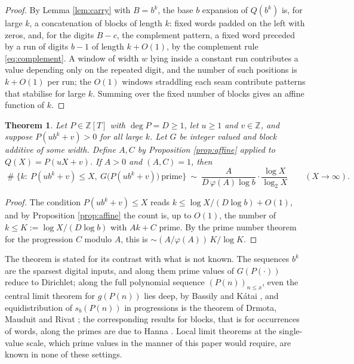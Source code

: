 \documentclass[11pt,reqno]{amsart}
\theoremstyle{plain}
\newtheorem{theorem}{Theorem}[section]
\theoremstyle{definition}
\newcommand{\Z}{\mathbb{Z}}
\DeclareMathOperator{\Card}{\#}
\begin{document}
\begin{proof}
By Lemma \ref{lem:carry} with $B=b^{k}$, the base $b$ expansion of $Q(b^k)$ is, for large $k$, a concatenation of blocks of length $k$: fixed words padded on the left with zeros, and, for the digits $B-c$, the complement pattern, a fixed word preceded by a run of digits $b-1$ of length $k+O(1)$, by the complement rule \eqref{eq:complement}. A window of width $w$ lying inside a constant run contributes a value depending only on the repeated digit, and the number of such positions is $k+O(1)$ per run; the $O(1)$ windows straddling each seam contribute patterns that stabilise for large $k$. Summing over the fixed number of blocks gives an affine function of $k$.
\end{proof}

\begin{theorem}\label{thm:blocking}
Let $P\in\Z[T]$ with $\deg P=D\ge1$, let $u\ge1$ and $v\in\Z$, and suppose $P(ub^{k}+v)>0$ for all large $k$. Let $G$ be integer valued and block additive of some width. Define $A,C$ by Proposition \ref{prop:affine} applied to $Q(X)=P(uX+v)$. If $A>0$ and $(A,C)=1$, then
\[
\Card\{k:\ P(ub^{k}+v)\le X,\ G\big(P(ub^{k}+v)\big)\ \text{prime}\}
\ \sim\ \frac{A}{D\,\varphi(A)\log b}\cdot\frac{\log X}{\log_2X}
\qquad(X\to\infty).
\]
\end{theorem}

\begin{proof}
The condition $P(ub^{k}+v)\le X$ reads $k\le\log X/(D\log b)+O(1)$, and by Proposition \ref{prop:affine} the count is, up to $O(1)$, the number of $k\le K:=\log X/(D\log b)$ with $Ak+C$ prime. By the prime number theorem for the progression $C$ modulo $A$, this is $\sim(A/\varphi(A))\,K/\log K$.
\end{proof}

The theorem is stated for its contrast with what is not known. The sequences $b^k$ are the sparsest digital inputs, and along them prime values of $G(P(\cdot))$ reduce to Dirichlet; along the full polynomial sequence $(P(n))_{n\le x}$, even the central limit theorem for $g(P(n))$ lies deep, by Bassily and K\'atai \cite{bassilykatai}, and equidistribution of $s_b(P(n))$ in progressions is the theorem of Drmota, Mauduit and Rivat \cite{dmr-polynomial}; the corresponding results for blocks, that is for occurrences of words, along the primes are due to Hanna \cite{hanna}. Local limit theorems at the single-value scale, which prime values in the manner of this paper would require, are known in none of these settings.
\end{document}
